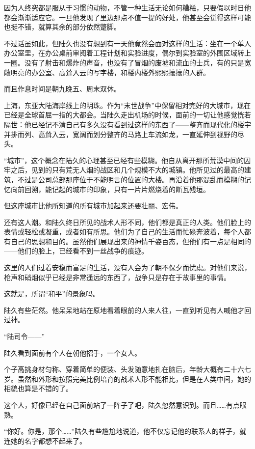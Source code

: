 因为人终究都是服从于习惯的动物，不管一种生活无论如何糟糕，只要假以时日他都会渐渐适应它。一旦他发现了里边那点不值一提的好处，他甚至会觉得这样可能也挺不错，就算其余的部分依然蹩脚。

不过话虽如此，但陆久也没有想到有一天他竟然会面对这样的生活：坐在一个单人办公室里，在办公桌前审阅着工程计划和实验进度，偶尔到实验室的外围区域转上一圈。没有了射击和爆炸的声音，也没有了冒烟的废墟和流血的士兵，有的只是宽敞明亮的办公室、高耸入云的写字楼，和楼内楼外熙熙攘攘的人群。

而且作息时间是朝九晚五、周末双休。

上海，东亚大陆海岸线上的明珠。作为“末世战争”中保留相对完好的大城市，现在已经是全球首屈一指的大都会。当陆久走出机场的时候，面前的一切让他感觉恍若隔世：他已经记不清自己有多久没有看到过这样的东西了——整齐而现代化的楼宇并排而列、高耸入云，宽阔而划分整齐的马路上车流如龙，一直延伸到视野的尽头。

“城市”，这个概念在陆久的心理甚至已经有些模糊。他自从离开那所荒漠中间的囚牢之后，见到的只有荒无人烟的战区和几个规模不大的城镇。他所见过的最高的建筑，不过是公司总部那座位于不能明言的位置的大楼。再沿着他那混乱而模糊的记忆向前回溯，能记起的城市的印象，只有一片片燃烧着的断瓦残垣。

但这座城市比他所知道的所有城市加起来还要壮丽、宏伟。

还有这人潮。和陆久终日所见的战术人形不同，他们都是真正的人类。他们脸上的表情或轻松或凝重，或者如有所思。他们为了自己的生活而忙碌奔波着，每个人都有自己的思想和目的。虽然他们展现出来的神情千姿百态，但他们有一点是相同的——他们的脸上，已经看不到一丝战争的痕迹。

这里的人们过着安稳而富足的生活，没有人会为了朝不保夕而忧虑。对他们来说，枪声和硝烟似乎已经是非常遥远的东西了，战争只是存在于故事里的事情。

这就是，所谓“和平”的景象吗。

陆久有些茫然。他呆呆地站在原地看着眼前的人来人往，一直到听见有人喊他才回过神。

“陆司令——”

陆久看到面前有个人在朝他招手，一个女人。

个子高挑身材匀称、穿着简单的便装、头发随意地扎在脑后，年龄大概有二十六七岁。虽然和外形和按照完美比例培育的战术人形不能相比，但是在人类中间，她的相貌也算是不错的了。

这个人，好像已经在自己面前站了一阵子了吧，陆久忽然意识到。而且……有点眼熟。

“你好。你是，那个……”陆久有些尴尬地说道，他不仅忘记他的联系人的样子，就连她的名字都想不起来了。

